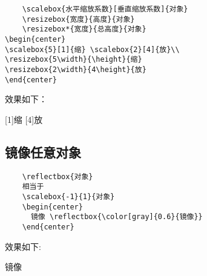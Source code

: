\begin{shaded}
  \begin{Verbatim}
    \scalebox{水平缩放系数}[垂直缩放系数]{对象}
    \resizebox{宽度}{高度}{对象}
    \resizebox*{宽度}{总高度}{对象}
\begin{center}
\scalebox{5}[1]{缩} \scalebox{2}[4]{放}\\
\resizebox{5\width}{\height}{缩}
\resizebox{2\width}{4\height}{放}
\end{center}
  \end{Verbatim}
\end{shaded}
效果如下：
\begin{shaded}
\begin{center}
 \scalebox{5}[1]{缩} \scalebox{2}[4]{放}\\
\end{center}
\end{shaded}

\subsection{镜像任意对象}

\begin{shaded}
  \begin{Verbatim}
    \reflectbox{对象}
    相当于
    \scalebox{-1}{1}{对象}
    \begin{center}
      镜像 \reflectbox{\color[gray]{0.6}{镜像}}
    \end{center}
  \end{Verbatim}
\end{shaded}

效果如下:
\begin{shaded}
    \begin{center}
      镜像 
    \end{center}
\end{shaded}


